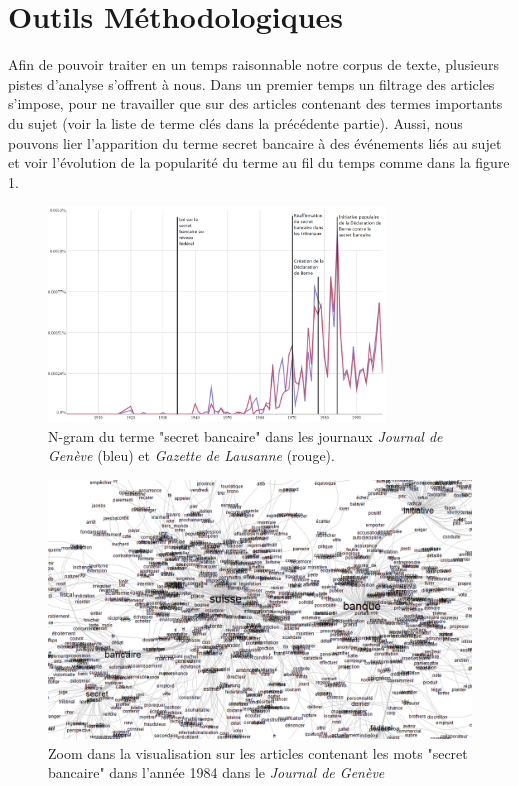 \documentclass[11pt]{article}
\begin{document}
\section{Outils Méthodologiques}

Afin de pouvoir traiter en un temps raisonnable notre corpus de texte, plusieurs
pistes d’analyse s’offrent à nous. Dans un premier temps un filtrage des
articles s’impose, pour ne travailler que sur des articles contenant des termes
importants du sujet (voir la liste de terme clés dans la précédente partie).
Aussi, nous pouvons lier l'apparition du terme secret bancaire à des événements
liés au sujet et voir l'évolution de la popularité du terme au fil du temps
comme dans la figure 1.

\begin{figure}[!htb]
  \centering
\includegraphics[width=0.8\textwidth]{ngram.png}
\caption{
  N-gram du terme "secret bancaire" dans les journaux \textit{Journal de Genève}
  (bleu) et \textit{Gazette de Lausanne} (rouge).
}
\end{figure}

\begin{figure}[!htb]
  \centering
  \includegraphics[width=1.0\textwidth]{reduced.png}
  \caption{Zoom dans la visualisation sur les articles contenant les mots "secret 
bancaire" dans l'année 1984 dans le \textit{Journal de Genève}}
\end{figure}
\end{document}
